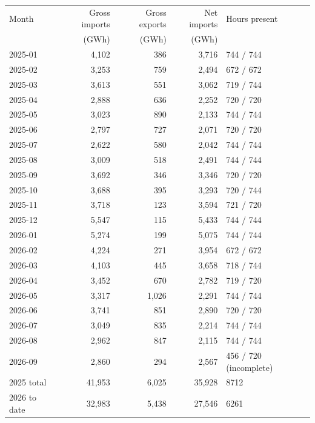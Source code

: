 \begin{tabular}{lrrrl}
\toprule
Month & Gross imports & Gross exports & Net imports & Hours present \\
 & (GWh) & (GWh) & (GWh) & \\
\midrule
2025-01 & 4,102 & 386 & 3,716 & 744 / 744 \\
2025-02 & 3,253 & 759 & 2,494 & 672 / 672 \\
2025-03 & 3,613 & 551 & 3,062 & 719 / 744 \\
2025-04 & 2,888 & 636 & 2,252 & 720 / 720 \\
2025-05 & 3,023 & 890 & 2,133 & 744 / 744 \\
2025-06 & 2,797 & 727 & 2,071 & 720 / 720 \\
2025-07 & 2,622 & 580 & 2,042 & 744 / 744 \\
2025-08 & 3,009 & 518 & 2,491 & 744 / 744 \\
2025-09 & 3,692 & 346 & 3,346 & 720 / 720 \\
2025-10 & 3,688 & 395 & 3,293 & 720 / 744 \\
2025-11 & 3,718 & 123 & 3,594 & 721 / 720 \\
2025-12 & 5,547 & 115 & 5,433 & 744 / 744 \\
2026-01 & 5,274 & 199 & 5,075 & 744 / 744 \\
2026-02 & 4,224 & 271 & 3,954 & 672 / 672 \\
2026-03 & 4,103 & 445 & 3,658 & 718 / 744 \\
2026-04 & 3,452 & 670 & 2,782 & 719 / 720 \\
2026-05 & 3,317 & 1,026 & 2,291 & 744 / 744 \\
2026-06 & 3,741 & 851 & 2,890 & 720 / 720 \\
2026-07 & 3,049 & 835 & 2,214 & 744 / 744 \\
2026-08 & 2,962 & 847 & 2,115 & 744 / 744 \\
2026-09 & 2,860 & 294 & 2,567 & 456 / 720 (incomplete) \\
\midrule 2025 total & 41,953 & 6,025 & 35,928 & 8712 \\
2026 to date & 32,983 & 5,438 & 27,546 & 6261 \\
\bottomrule
\end{tabular}